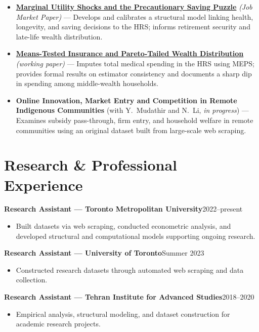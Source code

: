 \documentclass[10pt]{article}
\newcommand{\entry}[2]{%
  \textbf{#1}\hfill{#2}\par\vspace{2pt}%
}
\begin{document}
\begin{itemize}
  \item \href{https://aminshz.github.io/my-website/paper1.pdf}{\textbf{Marginal Utility Shocks and the Precautionary Saving Puzzle}} \textit{(Job Market Paper)} ---
    Develops and calibrates a structural model linking health, longevity, and saving decisions to the HRS;
    informs retirement security and late-life wealth distribution.

  \item \href{https://aminshz.github.io/my-website/paper2.pdf}{\textbf{Means-Tested Insurance and Pareto-Tailed Wealth Distribution}} \textit{(working paper)} ---
    Imputes total medical spending in the HRS using MEPS; provides formal results on estimator consistency
    and documents a sharp dip in spending among middle-wealth households.

  \item \textbf{Online Innovation, Market Entry and Competition in Remote Indigenous Communities}
    (with Y.~Mudathir and N.~Li, \textit{in progress}) ---
    Examines subsidy pass-through, firm entry, and household welfare in remote communities using an
    original dataset built from large-scale web scraping.
\end{itemize}

\section{Research \& Professional Experience}

\entry{Research Assistant --- Toronto Metropolitan University}{2022--present}
\begin{itemize}
  \item Built datasets via web scraping, conducted econometric analysis, and developed structural and
    computational models supporting ongoing research.
\end{itemize}

\vspace{4pt}
\entry{Research Assistant --- University of Toronto}{Summer 2023}
\begin{itemize}
  \item Constructed research datasets through automated web scraping and data collection.
\end{itemize}

\vspace{4pt}
\entry{Research Assistant --- Tehran Institute for Advanced Studies}{2018--2020}
\begin{itemize}
  \item Empirical analysis, structural modeling, and dataset construction for academic research projects.
\end{itemize}
\end{document}
